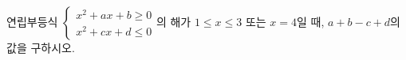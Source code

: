 연립부등식 $\begin{cases} x^2+ax+b\ge 0 \\ x^2+cx+d\le 0 \end{cases}$의 해가 $1\le x\le 3$ 또는 $x=4$일 때, $a+b-c+d$의 값을 구하시오. 
